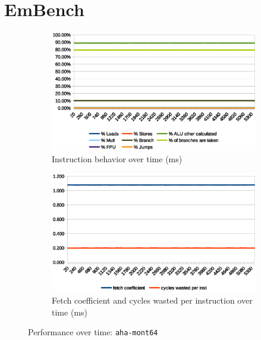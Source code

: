 \documentclass[../bachelor_paper.tex]{subfiles}
\begin{document}
\FloatBarrier
\section{EmBench}
\begin{figure}
    \begin{subfigure}{0.45\textwidth}
        \includegraphics[width=\textwidth]{img/graph/embench/aha-mont64_inst.eps}
        \caption{Instruction behavior over time (ms)}
    \end{subfigure}
    \begin{subfigure}{0.45\textwidth}
        \includegraphics[width=\textwidth]{img/graph/embench/aha-mont64_fetch_waste.eps}
        \caption{Fetch coefficient and cycles wasted per instruction over time (ms)}
    \end{subfigure}
    \caption{Performance over time: \texttt{aha-mont64}}
\end{figure}
\end{document}
